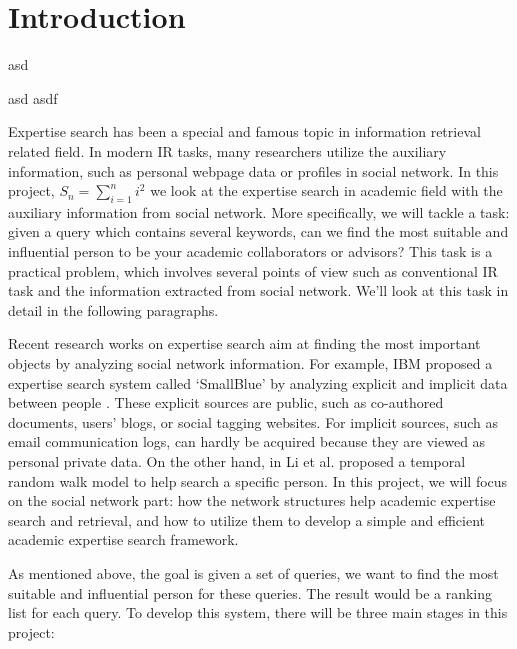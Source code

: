 \documentclass[12pt]{article}
\begin{document}
\maketitle


\section{Introduction}



asd

asd
asdf

Expertise search has been a special and famous topic in information retrieval related field.  In modern IR tasks, many researchers utilize the auxiliary information, such as personal webpage data or profiles in social network.  In this project, $ S_n = \sum_{i=1}^n i^2 $ we look at the expertise search in academic field with the auxiliary information from social network.  More specifically, we will tackle a task: given a query which contains several keywords, can we find the most suitable and influential person to { }{ }be your academic collaborators or advisors?  This task is a practical problem, which involves several points of view such as conventional IR task and the information extracted from social network.  We'll look at this task in detail in the following paragraphs.

Recent research works on expertise search aim at finding the most important objects by analyzing social network information.  For example, IBM proposed a expertise search system called `SmallBlue' by analyzing explicit and implicit data between people \cite{expertise_smallblue09}.  These explicit sources are public, such as co-authored documents, users' blogs, or social tagging websites.  For implicit sources, such as email communication logs, can hardly be acquired because they are viewed as personal private data.  On the other hand, in \cite{expertise_time08} Li et al. proposed a temporal random walk model to help search a specific person.  In this project, we will focus on the social network part: how the network structures help academic expertise search and retrieval, and how to utilize them to develop a simple and efficient academic expertise search framework.

As mentioned above, the goal is given a set of queries, we want to find the most suitable and influential person for these queries.  The result would be a ranking list for each query.
To develop this system, there will be three main stages in this project:
\end{document}
